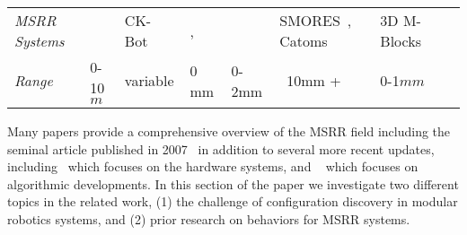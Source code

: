 \begin{table*}[h]
\begin{tabular}{ p{2.4 cm} p{\wdd}  p{\wdd} p{\wdd} p{\wdd} p{\wdd} p{\wdd} p{\wdd}  }
		\addlinespace[1ex] 	\textit{MSRR Systems}
		& \cite{StigmergyWerfel2006}	%
		& CK-Bot~\cite{park2008automatic}					%
		& \cite{Soldercubes2016}, ~\cite{ubot-Zhu-2014}	%
		& \cite{lin2017vision}								%
		& SMORES~\cite{TosunDaveyLiuYim-IROS2016}, Catoms~\cite{Kirby-IROS07}					%
		& 3D M-Blocks~\cite{Romanishin20153d}	\\ 			%
		
		\addlinespace[1ex] 	\textit{Range}			& 0-10$m$			& variable				& 0 mm				& 0-2mm			& ~10mm +			& 0-1$mm$	\\
	\end{tabular}
	\label{tab:tagTech}
\end{table*}


Many papers provide a comprehensive overview of the MSRR field including the seminal article published in 2007~\cite{Yim-RAM07} in addition to several more recent updates, including~\cite{chennareddy2017modular} which focuses on the hardware systems, and ~\cite{abukhalil2013survey} which focuses on algorithmic developments. In this section of the paper we investigate two different topics in the related work, (1) the challenge of configuration discovery in modular robotics systems, and (2) prior research on behaviors for MSRR systems.

